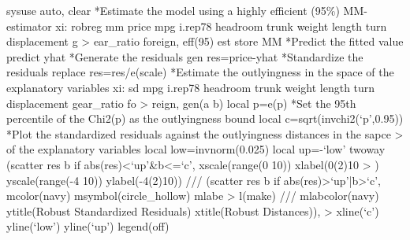 sysuse auto, clear
{\smallskip}
*Estimate the model using a highly efficient (95\%) MM-estimator
xi: robreg mm price mpg i.rep78 headroom trunk weight length turn displacement g
> ear_ratio foreign, eff(95)
est store MM
{\smallskip}
*Predict the fitted value
predict yhat
{\smallskip}
*Generate the residuals
gen res=price-yhat
{\smallskip}
*Standardize the residuals
replace res=res/e(scale)
{\smallskip}
*Estimate the outlyingness in the space of the explanatory variables
xi: sd  mpg i.rep78 headroom trunk weight length turn displacement gear_ratio fo
> reign, gen(a b)
local p=e(p)
{\smallskip}
*Set the 95th percentile of the Chi2(p) as the outlyingness bound
local c=sqrt(invchi2(`p',0.95))
{\smallskip}
*Plot the standardized residuals against the outlyingness distances in the sapce
>  of the explanatory variables
{\smallskip}
local low=invnorm(0.025)
local up=-`low'
{\smallskip}
twoway (scatter res b if abs(res)<`up'\&b<=`c', xscale(range(0 10)) xlabel(0(2)10
> ) yscale(range(-4 10)) ylabel(-4(2)10)) ///
(scatter res b if abs(res)>`up'|b>`c', mcolor(navy) msymbol(circle_hollow) mlabe
> l(make) ///
mlabcolor(navy) ytitle(Robust Standardized Residuals) xtitle(Robust Distances)),
>  xline(`c') yline(`low') yline(`up') legend(off)
